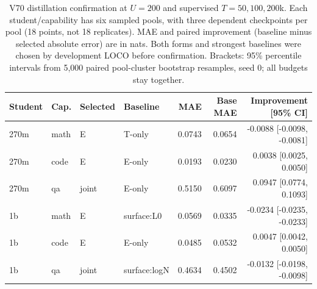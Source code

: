 \begin{table}[H]
\centering
\small
\caption{V70 distillation confirmation at $U=200$ and supervised $T=50,100,200$k. Each student/capability has six sampled pools, with three dependent checkpoints per pool (18 points, not 18 replicates). MAE and paired improvement (baseline minus selected absolute error) are in nats. Both forms and strongest baselines were chosen by development LOCO before confirmation. Brackets: 95\% percentile intervals from 5,000 paired pool-cluster bootstrap resamples, seed 0; all budgets stay together.}
\label{tab:distill_confirm}
\begin{tabular}{@{}ll ll rrr@{}}
\toprule
Student & Cap. & Selected & Baseline & MAE & Base MAE & Improvement [95\% CI] \\
\midrule
270m & math & E & T-only & 0.0743 & 0.0654 & -0.0088 [-0.0098, -0.0081] \\
270m & code & E & E-only & 0.0193 & 0.0230 & 0.0038 [0.0025, 0.0050] \\
270m & qa & joint & E-only & 0.5150 & 0.6097 & 0.0947 [0.0774, 0.1093] \\
1b & math & E & surface:L0 & 0.0569 & 0.0335 & -0.0234 [-0.0235, -0.0233] \\
1b & code & E & E-only & 0.0485 & 0.0532 & 0.0047 [0.0042, 0.0050] \\
1b & qa & joint & surface:logN & 0.4634 & 0.4502 & -0.0132 [-0.0198, -0.0098] \\
\bottomrule
\end{tabular}
\end{table}
